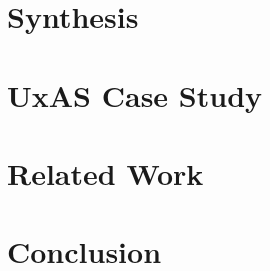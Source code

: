 \documentclass[conference]{IEEEtran}
\theoremstyle{plain}
\theoremstyle{definition}
\theoremstyle{remark}
\begin{document}
\section{Synthesis} \label{sec:synthesis}


\section{UxAS Case Study} \label{sec:case-study}


\section{Related Work} \label{sec:related-work}


\section{Conclusion} \label{sec:conclusion}



%
%
\end{document}
